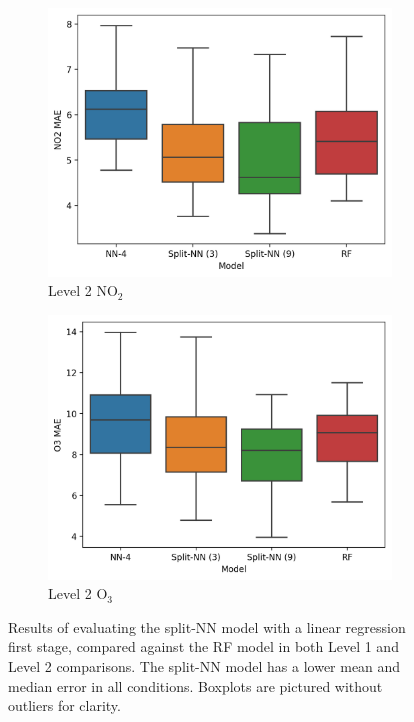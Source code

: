 \documentclass[journal abbreviation, manuscript]{copernicus}
\newcommand{\textus}[1]{$_{\text{#1}}$}
\begin{document}
\begin{figure}[H]
\begin{subfigure}{0.35\textwidth}
\end{subfigure}
\begin{subfigure}{0.35\textwidth}
\includegraphics[width=\textwidth]{results/split-no2-location-level2-mae}
\caption{Level 2 NO\textus{2}}
\end{subfigure}
\begin{subfigure}{0.35\textwidth}
\includegraphics[width=\textwidth]{results/split-o3-location-level2-mae}
\caption{Level 2 O\textus{3}}
\end{subfigure}
\caption{Results of evaluating the split-NN model with a linear regression first stage, compared against the RF model in both Level 1 and Level 2 comparisons. The split-NN model has a lower mean and median error in all conditions. Boxplots are pictured without outliers for clarity.}
\label{fig:split-results-lrfe}
\end{figure}
\end{document}
